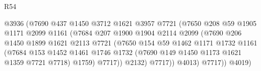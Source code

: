 \begin{lexlean}{R54}
\begin{coremodule}
                                        @3936
                                        (@7690
                                          @437
                                          @1450
                                          @3712
                                          @1621
                                          @3957
                                          @7721
                                          (@7650
                                            @208
                                            @59
                                            @1905
                                            @1171
                                            @2099
                                            @1161
                                            (@7684
                                              @207
                                              @1900
                                              @1904
                                              @2114
                                              @2099
                                              (@7690
                                                @206
                                                @1450
                                                @1899
                                                @1621
                                                @2113
                                                @7721
                                                (@7650
                                                  @154
                                                  @59
                                                  @1462
                                                  @1171
                                                  @1732
                                                  @1161
                                                  (@7684
                                                    @153
                                                    @1452
                                                    @1461
                                                    @1746
                                                    @1732
                                                    (@7690 @149 @1450 @1173 @1621 @1359 @7721 @7718)
                                                    @1759)
                                                  @7717))
                                              @2132)
                                            @7717))
                                        @4013)
                                      @7717))
                                  @4019)

\end{coremodule}
\end{lexlean}
